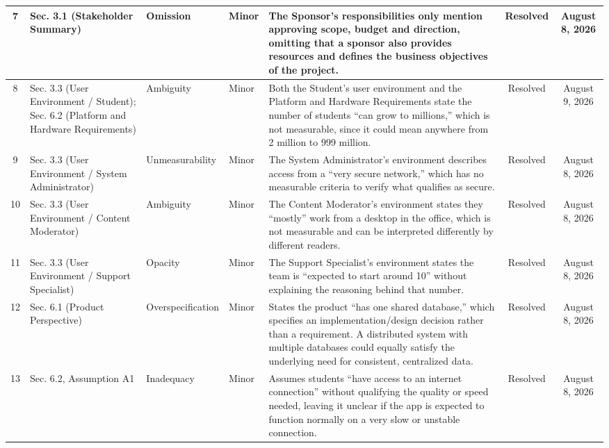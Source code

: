 \documentclass[10pt,letterpaper]{article}
\begin{document}
\begin{longtable}{|c|p{2.3cm}|p{2cm}|p{1.5cm}|p{4.5cm}|c|c|}
7 & Sec. 3.1 (Stakeholder Summary) & Omission & Minor & The Sponsor's responsibilities only mention approving scope, budget and direction, omitting that a sponsor also provides resources and defines the business objectives of the project. & Resolved & August 8, 2026 \\
\hline

8 & Sec. 3.3 (User Environment / Student); Sec. 6.2 (Platform and Hardware Requirements) & Ambiguity & Minor & Both the Student's user environment and the Platform and Hardware Requirements state the number of students ``can grow to millions,'' which is not measurable, since it could mean anywhere from 2 million to 999 million. & Resolved & August 9, 2026 \\
\hline

9 & Sec. 3.3 (User Environment / System Administrator) & Unmeasurability & Minor & The System Administrator's environment describes access from a ``very secure network,'' which has no measurable criteria to verify what qualifies as secure. & Resolved & August 8, 2026 \\
\hline

10 & Sec. 3.3 (User Environment / Content Moderator) & Ambiguity & Minor & The Content Moderator's environment states they ``mostly'' work from a desktop in the office, which is not measurable and can be interpreted differently by different readers. & Resolved & August 8, 2026 \\
\hline

11 & Sec. 3.3 (User Environment / Support Specialist) & Opacity & Minor & The Support Specialist's environment states the team is ``expected to start around 10'' without explaining the reasoning behind that number. & Resolved & August 8, 2026 \\
\hline

12 & Sec. 6.1 (Product Perspective) & Overspecification & Minor & States the product ``has one shared database,'' which specifies an implementation/design decision rather than a requirement. A distributed system with multiple databases could equally satisfy the underlying need for consistent, centralized data. & Resolved & August 8, 2026 \\
\hline

13 & Sec. 6.2, Assumption A1 & Inadequacy & Minor & Assumes students ``have access to an internet connection'' without qualifying the quality or speed needed, leaving it unclear if the app is expected to function normally on a very slow or unstable connection. & Resolved & August 8, 2026 \\
\hline


\end{longtable}
\end{document}
